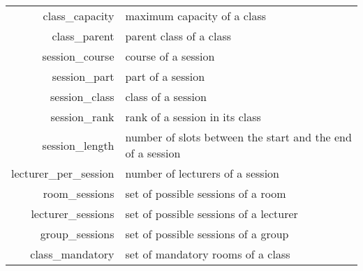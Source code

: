 \begin{table}[!ht]
{\begin{tabular}{|rl|}
class\_capacity             & maximum capacity of a class\\%
class\_parent               & parent class of a class\\
%
\hline
session\_course         & course of a session \\%
session\_part           & part of a session \\%
session\_class          & class of a session \\%
session\_rank           & rank of a session in its class \\%
session\_length         & number of slots between the start and the end of a session \\%
lecturer\_per\_session   & number of lecturers of a session \\%
room\_sessions          & set of possible sessions of a room \\%
lecturer\_sessions       & set of possible sessions of a lecturer \\%
group\_sessions         & set of possible sessions of a group \\%
class\_mandatory        & set of mandatory rooms of a class \\%

\end{tabular}}
\end{table}
